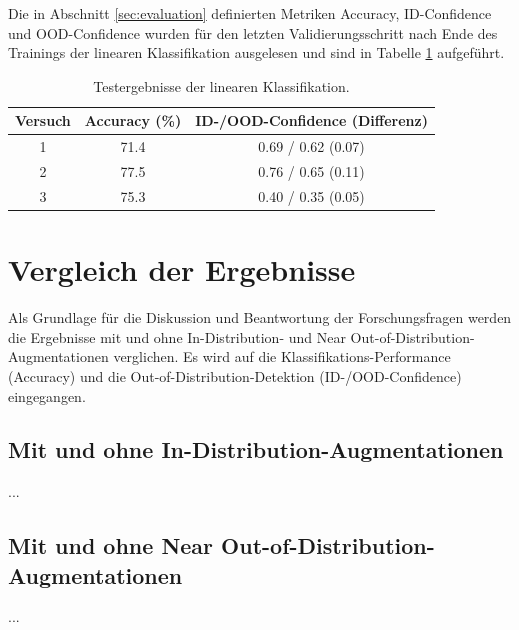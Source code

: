 Die in Abschnitt \ref{sec:evaluation} definierten Metriken Accuracy, ID-Confidence und OOD-Confidence wurden für den letzten Validierungsschritt nach Ende des Trainings der linearen Klassifikation ausgelesen und sind in Tabelle \ref{tab:supcon-lin-results} aufgeführt.

\begin{table}[h]
	\caption{Testergebnisse der linearen Klassifikation.}
	\begin{tabular}{|c|c|c|}
		\hline
		\textbf{Versuch} & \textbf{Accuracy (\%)} & \textbf{ID-/OOD-Confidence (Differenz)} \\
		\hline
		1 & 71.4 & 0.69 / 0.62 (0.07) \\
		2 & 77.5 & 0.76 / 0.65 (0.11) \\
		3 & 75.3 & 0.40 / 0.35 (0.05) \\
		\hline
	\end{tabular}
	\label{tab:supcon-lin-results}
\end{table}

\section{Vergleich der Ergebnisse} \label{sec:results-comparison}

Als Grundlage für die Diskussion und Beantwortung der Forschungsfragen werden die Ergebnisse mit und ohne In-Distribution- und Near Out-of-Distribution-Augmentationen verglichen. Es wird auf die Klassifikations-Performance (Accuracy) und die Out-of-Distribution-Detektion (ID-/OOD-Confidence) eingegangen.

\subsection{Mit und ohne In-Distribution-Augmentationen} \label{sec:results-comparison-id}

...

\subsection{Mit und ohne Near Out-of-Distribution-Augmentationen} \label{sec:results-comparison-ood}

...
